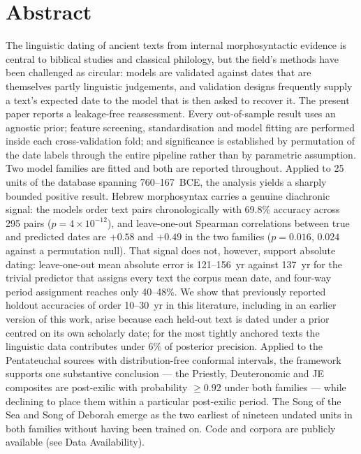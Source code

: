\section*{Abstract}

The linguistic dating of ancient texts from internal morphosyntactic
evidence is central to biblical studies and classical philology, but the
field's methods have been challenged as circular: models are validated
against dates that are themselves partly linguistic judgements, and
validation designs frequently supply a text's expected date to the model
that is then asked to recover it.  The present paper reports a
leakage-free reassessment.  Every out-of-sample result uses an agnostic
prior; feature screening, standardisation and model fitting are performed
inside each cross-validation fold; and significance is established by
permutation of the date labels through the entire pipeline rather than by
parametric assumption.  Two model families are fitted and both are
reported throughout.  Applied to 25 units of the \bhsa{} database spanning
760--167~BCE, the analysis yields a sharply bounded positive result.
Hebrew morphosyntax carries a genuine diachronic signal: the models order
text pairs chronologically with 69.8\% accuracy across 295 pairs
($p = 4 \times 10^{-12}$), and leave-one-out Spearman correlations between
true and predicted dates are $+0.58$ and $+0.49$ in the two families
($p = 0.016$, $0.024$ against a permutation null).  That signal does not,
however, support absolute dating: leave-one-out mean absolute error is
121--156~yr against 137~yr for the trivial predictor that assigns every
text the corpus mean date, and four-way period assignment reaches only
40--48\%.  We show that previously reported holdout accuracies of order
10--30~yr in this literature, including in an earlier version of this
work, arise because each held-out text is dated under a prior centred on
its own scholarly date; for the most tightly anchored texts the linguistic
data contributes under 6\% of posterior precision.  Applied to the
Pentateuchal sources with distribution-free conformal intervals, the
framework supports one substantive conclusion --- the Priestly,
Deuteronomic and JE composites are post-exilic with probability
$\geq 0.92$ under both families --- while declining to place them within a
particular post-exilic period.  The Song of the Sea and Song of Deborah
emerge as the two earliest of nineteen undated units in both families
without having been trained on.  Code and corpora are publicly available
(see Data Availability).
